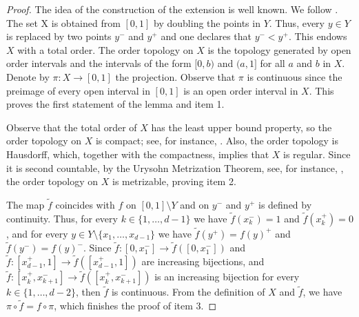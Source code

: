 \documentclass[10pt,a4paper]{amsart}
\numberwithin{equation}{section} %
\numberwithin{figure}{section} %
\renewcommand{\=}{\coloneqq}
\begin{document}
\begin{proof}
    The idea of the construction of the extension is well known. We follow \cite[Appendix A.5]{Keller2}. The set X is obtained from $[0,1]$ by doubling the points in $Y$. Thus, every $y\in Y$ is replaced by two points $y^-$ and $y^+$ and one declares that $y^-<y^+$. This endows $X$ with a total order. The order topology on $X$ is the topology generated by open order intervals and the intervals of the form $[0,b)$ and $(a,1]$ for all $a$ and $b$ in $X$. Denote by $\pi: X\to[0,1]$ the projection. Observe that $\pi$ is continuous since the preimage of every open interval in $[0,1]$ is an open order interval in $X$. This proves the first statement of the lemma and item 1.

    Observe that the total order of $X$ has the least upper bound property, so the order topology on $X$ is compact; see, for instance, \cite[Theorem 27.1]{munkres}. Also, the order topology is Hausdorff, which, together with the compactness, implies that $X$ is regular. Since it is second countable, by the Urysohn Metrization Theorem, see, for instance, \cite[Theorem 34.1]{munkres}, the order topology on $X$ is metrizable, proving item 2.

    The map $\widetilde{f}$ coincides with $f$ on $[0,1]\setminus Y$ and on $y^-$ and $y^+$ is defined by continuity. Thus, for every $k\in \{1,\ldots,d-1\}$ we have $\widetilde{f}(x_k^-)=1$ and $\widetilde{f}(x_k^+)=0$, and for every $y\in Y\setminus \{x_1,\ldots,x_{d-1}\}$ we have $\widetilde{f}(y^+) = f(y)^+$ and $\widetilde{f}(y^-)=f(y)^-$. Since $\widetilde{f}: [0,x_1^-]\to \widetilde{f}([0,x_1^-])$ and $\widetilde{f}: [x_{d-1}^+,1]\to \widetilde{f}([x_{d-1}^+,1])$ are increasing bijections, and $\widetilde{f}: [x_k^+,x_{k+1}^-]\to \widetilde{f}([x_k^+,x_{k+1}^-])$ is an increasing bijection for every $k\in\{1,\ldots, d-2\}$, then $\widetilde{f}$ is continuous. From the definition of $X$ and $\widetilde{f}$, we have $\pi\circ\widetilde{f}= f\circ\pi$, which finishes the proof of item 3.


\end{proof}
\end{document}
